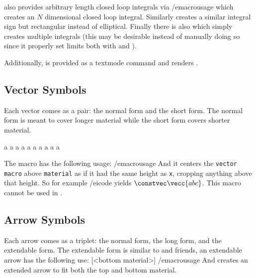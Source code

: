 \bigskip
\pdfMsym{} also provides arbitrary length closed loop integrals via
\macrousage {} /emacrousage
which creates an $N$ dimensional closed loop integral.
Similarly \macroname\biNint{} creates a similar integral sign but rectangular instead of elliptical.
Finally there is also \macroname\iNint{} which simply creates multiple integrals (this may be desirable instead of manually doing so since it properly set limits both with \macroname\limits{} and
\macroname\nolimits).


Additionally, \macroname\lightning{} is provided as a textmode command and renders \lightning.

\subsection{Vector Symbols}

Each vector comes as a pair: the normal form and the short form.
The normal form is meant to cover longer material while the short form covers shorter material.

\bigskip
\showcaseveccs\vecc{}a
\showcasevecc{}a
\showcasevecc{}a
\showcaseveccs\straightvecc{}a
\vfill\eject
\showcaseveccs\straightlvecc{}a
\showcaseveccs\overrightharp{}a
\showcaseveccs\overleftharp{}a
\showcaseveccs\overleftrightvecc{}a
\showcaseveccs\overleftrightharp{}a
\showcaseveccs\overrightleftharp{}a

\unless\ifx\pdfxform\undefined
The \macroname\constvec{} macro has the following usage:
\macrousage {} /emacrousage
And it centers the {\tt vector macro} above {\tt material} as if it had the same height as {\tt x}, cropping anything above
that height.
So for example \icode \constvec{}/eicode{} yields $\constvec\vecc{abc}$.
This macro cannot be used in \xetex.
\fi
\subsection{Arrow Symbols}

Each arrow comes as a triplet: the normal form, the long form, and the extendable form.
The extendable form is similar to \macroname\xrightarrow{} and friends, an extendable arrow has the following use:
\macrousage {}[<bottom material>] /emacrousage
And creates an extended arrow to fit both the top and bottom material.

